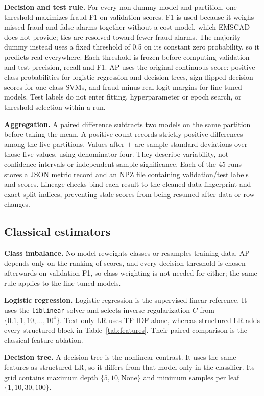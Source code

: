 \textbf{Decision and test rule.} For every non-dummy model and partition, one threshold maximizes
fraud F1 on validation scores. F1 is used because it weighs missed fraud and false alarms together
without a cost model, which EMSCAD does not provide; ties are resolved toward fewer fraud alarms. The majority dummy instead
uses a fixed threshold of 0.5 on its constant zero probability, so it predicts real everywhere. Each
threshold is frozen before computing validation and test precision, recall and F1. AP uses the original continuous score:
positive-class probabilities for logistic regression and decision trees, sign-flipped decision scores
for one-class SVMs, and fraud-minus-real logit margins for fine-tuned models. Test labels do not
enter fitting,
hyperparameter or epoch search, or threshold selection within a run.

\textbf{Aggregation.} A paired difference subtracts two models on the same partition before taking
the mean. A positive count records strictly positive differences among the five partitions. Values
after $\pm$ are sample standard deviations over those five values, using denominator four. They
describe variability, not confidence intervals or independent-sample significance. Each of the 45
runs stores a JSON metric record and an NPZ file containing validation/test labels and scores.
Lineage checks bind each result to the cleaned-data fingerprint and exact split indices, preventing
stale scores from being resumed after data or row changes.

\subsection{Classical estimators}

\textbf{Class imbalance.} No model reweights classes or resamples training data. AP depends only on
the ranking of scores, and every decision threshold is chosen afterwards on validation F1, so class
weighting is not needed for either; the same rule applies to the fine-tuned models.

\textbf{Logistic regression.} Logistic regression is the supervised linear reference. It uses the
\texttt{liblinear} solver and selects inverse regularization $C$ from $\{0.1,1,10,\dots,10^4\}$. Text-only LR uses TF-IDF alone, whereas
structured LR adds every structured block in Table~\ref{tab:features}. Their paired comparison is
the classical feature ablation.

\textbf{Decision tree.} A decision tree is the nonlinear contrast. It uses the same features as
structured LR, so it differs from that model only in the classifier. Its grid contains maximum depth $\{5,10,\mathrm{None}\}$ and minimum samples per leaf $\{1,10,30,100\}$.

